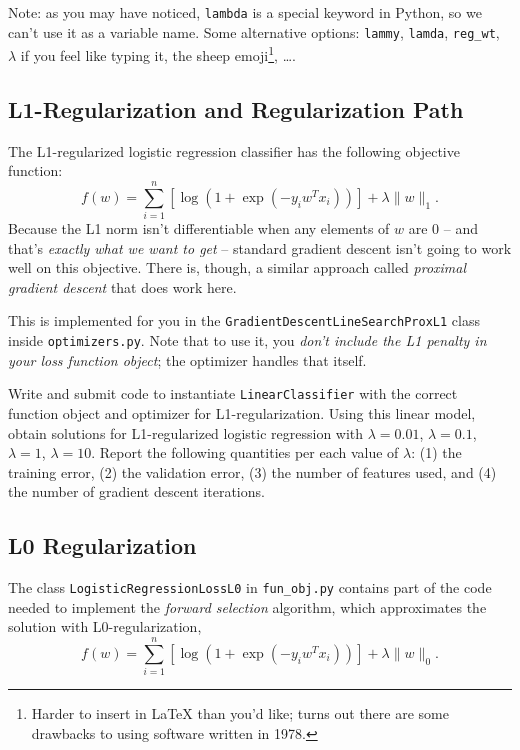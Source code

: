 \documentclass{article}
\def\norm#1{\|#1\|}
\newenvironment{asking}{\begingroup\color{blu}}{\endgroup}
\begin{document}
Note: as you may have noticed, \verb|lambda| is a special keyword in Python, so we can't use it as a variable name.
Some alternative options:
\verb|lammy|,
\verb|lamda|,
\verb|reg_wt|,
$\lambda$ if you feel like typing it,
the sheep emoji\footnote{Harder to insert in \LaTeX{} than you'd like; turns out there are some drawbacks to using software written in 1978.},
\dots.

\pagebreak

\subsection{L1-Regularization and Regularization Path }
The L1-regularized logistic regression classifier has the following objective function:
\[
f(w) = \sum_{i=1}^n \left[\log(1+\exp(-y_iw^Tx_i))\right] + \lambda\norm{w}_1.
\]
Because the L1 norm isn't differentiable when any elements of $w$ are $0$ -- and that's \emph{exactly what we want to get} -- standard gradient descent isn't going to work well on this objective.
There is, though, a similar approach called \emph{proximal gradient descent} that does work here.%

This is implemented for you in the \verb|GradientDescentLineSearchProxL1| class inside \verb|optimizers.py|.
Note that to use it, you \emph{don't include the L1 penalty in your loss function object};
the optimizer handles that itself.

\begin{asking}Write and submit code to instantiate \verb|LinearClassifier| with the correct function object and optimizer for L1-regularization. Using this linear model, obtain solutions for L1-regularized logistic regression with $\lambda = 0.01$, $\lambda = 0.1$, $\lambda = 1$, $\lambda = 10$. Report the following quantities per each value of $\lambda$: (1) the training error, (2) the validation error, (3) the number of features used, and (4) the number of gradient descent iterations.\end{asking}

\pagebreak

\subsection{L0 Regularization }

The class \verb|LogisticRegressionLossL0| in \verb|fun_obj.py| contains part of the code needed to implement the \emph{forward selection} algorithm,
which approximates the solution with L0-regularization,
\[
f(w) =  \sum_{i=1}^n \left[\log(1+\exp(-y_iw^Tx_i))\right] + \lambda\norm{w}_0.
\]
\end{document}
